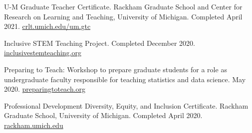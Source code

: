 \documentclass[letterpaper,11pt]{article} %
\begin{document}
	\renewcommand{\arraystretch}{1.25}
	\begin{etaremune}
		\item U-M Graduate Teacher Certificate. Rackham Graduate School and Center for Research on Learning and Teaching, University of Michigan. Completed April 2021. \href{https://crlt.umich.edu/um.gtc/description}{crlt.umich.edu/um.gtc} 
		\item Inclusive STEM Teaching Project. Completed December 2020. \href{https://www.inclusivestemteaching.org/}{inclusivestemteaching.org}
		\item Preparing to Teach: Workshop to prepare graduate students for a role as undergraduate faculty responsible for teaching statistics and data science. May 2020. \href{https://preparingtoteach.org/}{preparingtoteach.org}
		\item Professional Development Diversity, Equity, and Inclusion Certificate. Rackham Graduate School, University of Michigan. Completed April 2020. \href{https://rackham.umich.edu/professional-development/dei-certificate/}{rackham.umich.edu}
	\end{etaremune}
%
\end{document}
